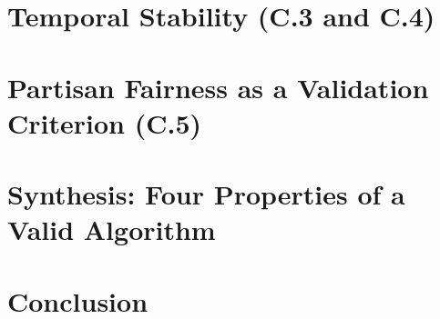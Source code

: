 \documentclass[12pt]{article}
\begin{document}
\section{Temporal Stability (C.3 and C.4)}
\label{sec:temporal}


\section{Partisan Fairness as a Validation Criterion (C.5)}
\label{sec:partisan}


\section{Synthesis: Four Properties of a Valid Algorithm}
\label{sec:synthesis}


\section{Conclusion}
\label{sec:conclusion}




\end{document}
